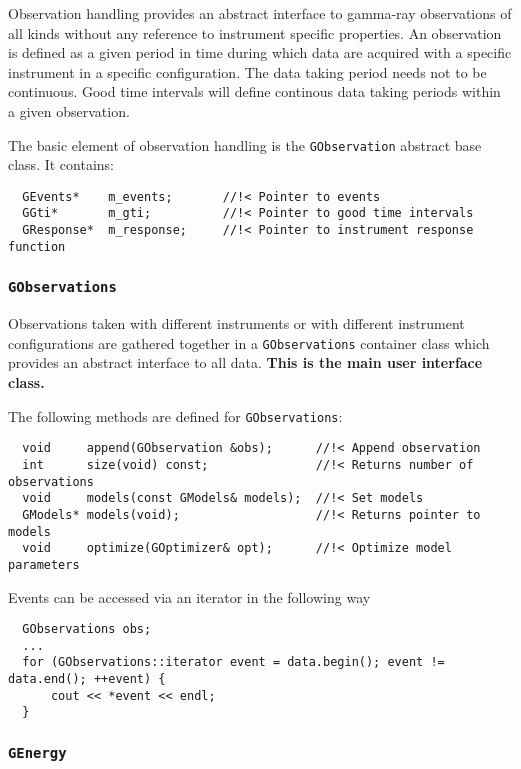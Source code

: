 \documentclass{article}[12pt,a4]
\begin{document}
Observation handling provides an abstract interface to gamma-ray observations of all kinds
without any reference to instrument specific properties.
An observation is defined as a given period in time during which data are acquired with a
specific instrument in a specific configuration.
The data taking period needs not to be continuous.
Good time intervals will define continous data taking periods within a given observation.

The basic element of observation handling is the {\tt GObservation} abstract base class.
It contains:
\begin{verbatim}
  GEvents*    m_events;       //!< Pointer to events
  GGti*       m_gti;          //!< Pointer to good time intervals
  GResponse*  m_response;     //!< Pointer to instrument response function
\end{verbatim}


\subsubsection{{\tt GObservations}}

Observations taken with different instruments or with different instrument configurations are
gathered together in a {\tt GObservations} container class which provides an abstract interface 
to all data.
{\bf This is the main user interface class.}

The following methods are defined for {\tt GObservations}:
\begin{verbatim}
  void     append(GObservation &obs);      //!< Append observation
  int      size(void) const;               //!< Returns number of observations
  void     models(const GModels& models);  //!< Set models
  GModels* models(void);                   //!< Returns pointer to models
  void     optimize(GOptimizer& opt);      //!< Optimize model parameters
\end{verbatim}

Events can be accessed via an iterator in the following way
\begin{verbatim}
  GObservations obs;
  ...
  for (GObservations::iterator event = data.begin(); event != data.end(); ++event) {
      cout << *event << endl;
  }
\end{verbatim}


\subsubsection{{\tt GEnergy}}
\end{document}
